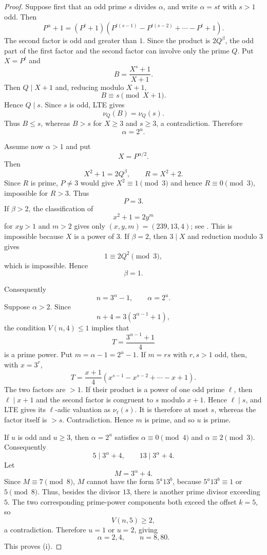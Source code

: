 \documentclass[11pt]{article}
\begin{document}
\begin{proof}
Suppose first that an odd prime $s$ divides $\alpha$, and write
$\alpha=st$ with $s>1$ odd.  Then
\[
P^\alpha+1
=(P^t+1)
\left(P^{t(s-1)}-P^{t(s-2)}+\cdots-P^t+1\right).
\]
The second factor is odd and greater than $1$.  Since the product is
$2Q^\beta$, the odd part of the first factor and the second factor can
involve only the prime $Q$.  Put $X=P^t$ and
\[
B=\frac{X^s+1}{X+1}.
\]
Then $Q\mid X+1$ and, reducing modulo $X+1$,
\[
B\equiv s\pmod{X+1}.
\]
Hence $Q\mid s$.  Since $s$ is odd, LTE gives
\[
\nu_Q(B)=\nu_Q(s).
\]
Thus $B\le s$, whereas $B>s$ for $X\ge3$ and $s\ge3$, a contradiction.
Therefore
\[
\boxed{\alpha=2^u}.
\]

Assume now $\alpha>1$ and put
\[
X=P^{\alpha/2}.
\]
Then
\[
X^2+1=2Q^\beta,
\qquad
R=X^2+2.
\]
Since $R$ is prime, $P\neq3$ would give $X^2\equiv1\pmod3$ and hence
$R\equiv0\pmod3$, impossible for $R>3$.  Thus
\[
P=3.
\]
If $\beta>2$, the classification of
\[
x^2+1=2y^m
\]
for $xy>1$ and $m>2$ gives only $(x,y,m)=(239,13,4)$;
see \cite{Cohn1993,SteinerTzanakis1991}.  This is impossible because
$X$ is a power of $3$.  If $\beta=2$, then $3\mid X$ and reduction modulo
$3$ gives
\[
1\equiv2Q^2\pmod3,
\]
which is impossible.  Hence
\[
\boxed{\beta=1}.
\]

Consequently
\[
n=3^\alpha-1,
\qquad \alpha=2^u.
\]
Suppose $\alpha>2$.  Since
\[
n+4=3(3^{\alpha-1}+1),
\]
the condition $V(n,4)\le1$ implies that
\[
T=\frac{3^{\alpha-1}+1}{4}
\]
is a prime power.  Put $m=\alpha-1=2^u-1$.  If $m=rs$ with $r,s>1$ odd,
then, with $x=3^r$,
\[
T=\frac{x+1}{4}
\left(x^{s-1}-x^{s-2}+\cdots-x+1\right).
\]
The two factors are $>1$.  If their product is a power of one odd prime
$\ell$, then $\ell\mid x+1$ and the second factor is congruent to $s$
modulo $x+1$.  Hence $\ell\mid s$, and LTE gives its $\ell$-adic
valuation as $\nu_\ell(s)$.  It is therefore at most $s$, whereas the
factor itself is $>s$.  Contradiction.  Hence $m$ is prime, and so
$u$ is prime.

If $u$ is odd and $u\ge3$, then $\alpha=2^u$ satisfies
$\alpha\equiv0\pmod4$ and $\alpha\equiv2\pmod3$.  Consequently
\[
5\mid 3^\alpha+4,
\qquad
13\mid 3^\alpha+4.
\]
Let
\[
M=3^\alpha+4.
\]
Since $M\equiv7\pmod8$, $M$ cannot have the form $5^a13^b$, because
$5^a13^b\equiv1$ or $5\pmod8$.  Thus, besides the divisor $13$, there is
another prime divisor exceeding $5$.  The two corresponding prime-power
components both exceed the offset $k=5$, so
\[
V(n,5)\ge2,
\]
a contradiction.  Therefore $u=1$ or $u=2$, giving
\[
\alpha=2,4,
\qquad n=8,80.
\]
This proves (i).


\end{proof}
\end{document}
